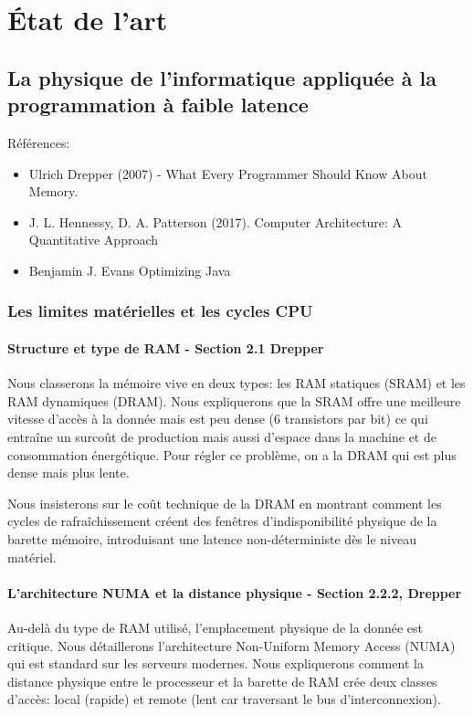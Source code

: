 \section{État de l'art}
\subsection{La physique de l'informatique appliquée à la programmation à faible latence}

Références: 

\begin{itemize}
    \item Ulrich Drepper (2007) - What Every Programmer Should Know About Memory.
    \item  J. L. Hennessy, D. A. Patterson (2017). Computer Architecture: A Quantitative Approach
    \item Benjamin J. Evans Optimizing Java
\end{itemize}


\subsubsection{Les limites matérielles et les cycles CPU}

\paragraph{Structure et type de RAM - Section 2.1 Drepper}

Nous classerons la mémoire vive en deux types: les RAM statiques (SRAM) et les RAM dynamiques (DRAM). Nous expliquerons que la SRAM offre une meilleure vitesse d'accès à la donnée mais est peu dense (6 transistors par bit) ce qui entraîne un surcoût de production mais aussi d'espace dans la machine et de consommation énergétique. Pour régler ce problème, on a la DRAM qui est plus dense mais plus lente. 

Nous insisterons sur le coût technique de la DRAM en montrant comment les cycles de rafraîchissement créent des fenêtres d'indisponibilité physique de la barette mémoire, introduisant une latence non-déterministe dès le niveau matériel.

\paragraph{L'architecture NUMA et la distance physique - Section 2.2.2, Drepper}

Au-delà du type de RAM utilisé, l'emplacement physique de la donnée est critique. Nous détaillerons l'architecture Non-Uniform Memory Access (NUMA) qui est standard sur les serveurs modernes. Nous expliquerons comment la distance physique entre le processeur et la barette de RAM crée deux classes d'accès: local (rapide) et remote (lent car traversant le bus d'interconnexion).

